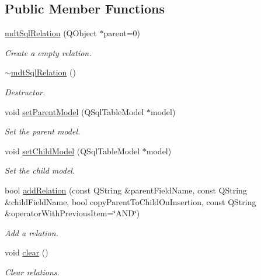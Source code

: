 \subsection*{Public Member Functions}
\begin{DoxyCompactItemize}
\item 
\hypertarget{classmdt_sql_relation_a65d9602a4663c8c356938ba9a217704f}{
\hyperlink{classmdt_sql_relation_a65d9602a4663c8c356938ba9a217704f}{mdtSqlRelation} (QObject $\ast$parent=0)}
\label{classmdt_sql_relation_a65d9602a4663c8c356938ba9a217704f}

\begin{DoxyCompactList}\small\item\em Create a empty relation. \end{DoxyCompactList}\item 
\hypertarget{classmdt_sql_relation_a22c7de1daa71abbde33199a08541310b}{
\hyperlink{classmdt_sql_relation_a22c7de1daa71abbde33199a08541310b}{$\sim$mdtSqlRelation} ()}
\label{classmdt_sql_relation_a22c7de1daa71abbde33199a08541310b}

\begin{DoxyCompactList}\small\item\em Destructor. \end{DoxyCompactList}\item 
void \hyperlink{classmdt_sql_relation_a5ac3a82c5d3e33b5e40b86acfe7e2a03}{setParentModel} (QSqlTableModel $\ast$model)
\begin{DoxyCompactList}\small\item\em Set the parent model. \end{DoxyCompactList}\item 
void \hyperlink{classmdt_sql_relation_ad74021dcf86c528044bf67220ed36833}{setChildModel} (QSqlTableModel $\ast$model)
\begin{DoxyCompactList}\small\item\em Set the child model. \end{DoxyCompactList}\item 
bool \hyperlink{classmdt_sql_relation_a5980d1df4582971666ffe1c1d7639799}{addRelation} (const QString \&parentFieldName, const QString \&childFieldName, bool copyParentToChildOnInsertion, const QString \&operatorWithPreviousItem=\char`\"{}AND\char`\"{})
\begin{DoxyCompactList}\small\item\em Add a relation. \end{DoxyCompactList}\item 
void \hyperlink{classmdt_sql_relation_a01469fb1baf7327ca6ddbcd1595e0d7c}{clear} ()
\begin{DoxyCompactList}\small\item\em Clear relations. \end{DoxyCompactList}\end{DoxyCompactItemize}


